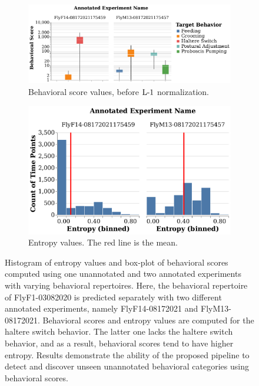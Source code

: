 \begin{figure}[hbt!]
	\centering
	\begin{subfigure}[b]{0.545\linewidth}
		\centering\includegraphics[width=\linewidth]{figures/BehavioralScores-RepertoireDifference.pdf}
		\caption{Behavioral score values, before $\textnormal{L-}1$ normalization. \label{figure:repertoire-score-comparison}}
	\end{subfigure}%
    \hfill
	\begin{subfigure}[b]{0.445\linewidth}
		\centering\includegraphics[width=\linewidth]{figures/Entropy-RepertoireDifference.pdf}
		\caption{Entropy values. The red line is the mean. \label{figure:repertoire-entropy-comparison}}
	\end{subfigure}%
	\caption[Histogram of entropy values and box-plot of the behavioral scores computed using one unannotated and two annotated experiments with varying behavioral repertoires.]{Histogram of entropy values and box-plot of behavioral scores computed using one unannotated and two annotated experiments with varying behavioral repertoires.
		Here, the behavioral repertoire of FlyF1-03082020 is predicted separately with two different annotated experiments, namely FlyF14-08172021 and FlyM13-08172021.
		Behavioral scores and entropy values are computed for the haltere switch behavior.
		The latter one lacks the haltere switch behavior, and as a result, behavioral scores tend to have higher entropy.
		Results demonstrate the ability of the proposed pipeline to detect and discover unseen unannotated behavioral categories using behavioral scores.\label{figure:repertoire-difference}}
\end{figure}

